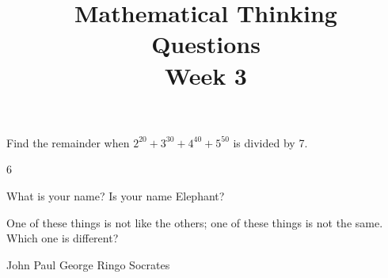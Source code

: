 \documentclass[12pt, answers]{exam}
\title{\begin{framed}
    \textbf{Mathematical Thinking}\\Questions\\Week 3
\end{framed}}
\date{}
\begin{document}
\maketitle
\pointsinrightmargin
\unframedsolutions
\begin{questions}
\question[1] Find the remainder when $2^{20} + 3^{30} + 4^{40} + 5^{50}$ is divided by 7.
\begin{solution}
    6
\end{solution}
\question[1] What is your name?
\question[1] Is your name Elephant?
\question
One of these things is not like the others; one of these things is not
the same. Which one is different?
\begin{choices}
\choice John
\choice Paul
\choice George
\choice Ringo
\choice Socrates
\end{choices}
\end{questions}
\end{document}
